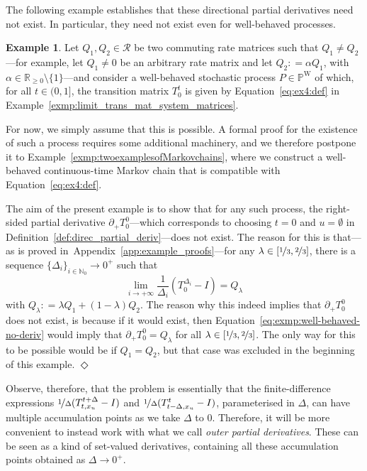 \documentclass[10pt,a4paper]{paper}
\theoremstyle{definition}
\newtheorem{exmp}{Example}
\newcommand{\nats}{\mathbb{N}}
\newcommand{\reals}{\mathbb{R}}
\newcommand{\realsnonneg}{\reals_{\geq 0}}
\newcommand{\processes}{\mathbb{P}}
\newcommand{\wprocesses}{\processes^{\mathrm{W}}}
\newcommand{\coloneqq}{:\!=}
\newcommand{\exampleend}{\hfill$\Diamond$}
\newcommand{\exampleproofref}{Appendix~\ref{app:example_proofs}}
\begin{document}
The following example establishes that these directional partial derivatives need not exist. In particular, they need not exist even for well-behaved processes.
\begin{exmp}\label{exmp:well-behaved-no-deriv}
Let $Q_1,Q_2\in\mathcal{R}$ be two commuting rate matrices such that $Q_1\neq Q_2$---for example, let $Q_1\neq0$ be an arbitrary rate matrix and let $Q_2\coloneqq\alpha Q_1$, with $\alpha\in\realsnonneg\setminus\{1\}$---and consider a well-behaved stochastic process $P\in\wprocesses$ of which, for all $t\in(0,1]$, the transition matrix $T_0^t$ is given by Equation~\eqref{eq:ex4:def} in Example~\ref{exmp:limit_trans_mat_system_matrices}. 

For now, we simply assume that this is possible. A formal proof for the existence of such a process requires some additional machinery, and we therefore postpone it to Example~\ref{exmp:twoexamplesofMarkovchains}, where we construct a well-behaved continuous-time Markov chain that is compatible with Equation~\eqref{eq:ex4:def}.

The aim of the present example is to show that for any such process, the right-sided partial derivative $\partial_{+}{T_{0}^0}$---which corresponds to choosing $t=0$ and $u=\emptyset$ in Definition~\ref{def:direc_partial_deriv}---does not exist. The reason for this is that---as is proved in~\exampleproofref---for any $\lambda\in[\nicefrac{1}{3},\nicefrac{2}{3}]$, there is a sequence $\{\Delta_i\}_{i\in\nats_0}\to0^+$ such that
\begin{equation}\label{eq:exmp:well-behaved-no-deriv}
\lim_{i\to+\infty}
\frac{1}{\Delta_i}
(T^{\Delta_i}_{0}-I)=Q_\lambda
\end{equation}
with $Q_\lambda\coloneqq \lambda Q_1+(1-\lambda)Q_2$. The reason why this indeed implies that $\partial_{+}{T_{0}^0}$ does not exist, is because if it would exist, then Equation~\eqref{eq:exmp:well-behaved-no-deriv} would imply that $\partial_{+}{T_{0}^0}=Q_\lambda$ for all $\lambda\in[\nicefrac{1}{3},\nicefrac{2}{3}]$. The only way for this to be possible would be if $Q_1=Q_2$, but that case was excluded in the beginning of this example.
\exampleend
\end{exmp}

Observe, therefore, that the problem is essentially that the finite-difference expressions $\nicefrac{1}{\Delta}(T_{t,x_u}^{t+\Delta} - I)$ and $\nicefrac{1}{\Delta}(T_{t-\Delta,x_u}^{t} - I)$, parameterised in $\Delta$, can have multiple accumulation points as we take $\Delta$ to $0$. Therefore, it will be more convenient to instead work with what we call \emph{outer partial derivatives}. These can be seen as a kind of set-valued derivatives, containing all these accumulation points obtained as $\Delta\to0^+$.
\end{document}
